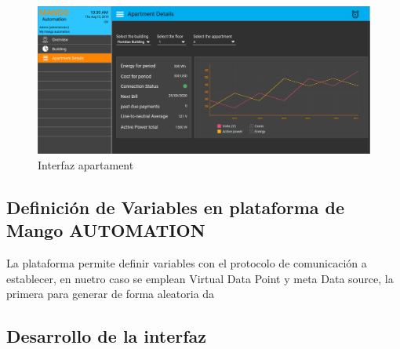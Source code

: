 \begin{itemize}
        \begin{figure}[H]
            \centering
                \includegraphics[scale=0.2]
                {apartment.pdf}
            \caption{Interfaz apartament}
            \label{figInterfazApartment}
        \end{figure}
    \end{itemize}
\subsection{Definición de Variables en plataforma de Mango AUTOMATION}
    La plataforma permite definir variables con el protocolo de comunicación a establecer, en nuetro caso se emplean Virtual Data Point 
    y meta Data source, la primera para generar de forma aleatoria da
\subsection{Desarrollo de la interfaz}
    
\newpage